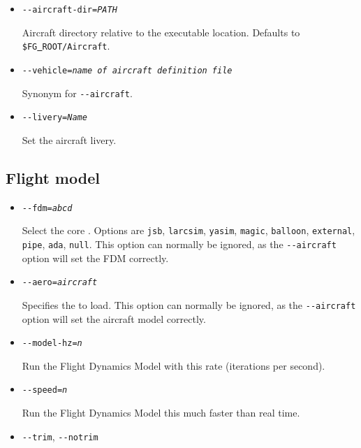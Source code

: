 {\begin{itemize}
\item{\texttt{-$ $-aircraft-dir={\it PATH}}}

Aircraft directory relative to the executable location. Defaults to \texttt{\$FG\underline{~}ROOT/Aircraft}.

\item{\texttt{-$ $-vehicle={\it name of aircraft definition file}}}

Synonym for \texttt{-$ $-aircraft}.

\item{\texttt{-$ $-livery={\it Name}}}

Set the aircraft livery.

\end{itemize}

\subsection{Flight model}\label{flight dynamics model}
\begin{itemize}
\item{\texttt{-$ $-fdm={\it abcd}}}

Select the core . Options are \texttt{jsb}, \texttt{larcsim}, \texttt{yasim},
\texttt{magic}, \texttt{balloon}, \texttt{external}, \texttt{pipe}, \texttt{ada}, \texttt{null}.
This option can normally be ignored, as the \texttt{-$ $-aircraft} option will set the FDM correctly.

\item{\texttt{-$ $-aero={\it aircraft}}}

Specifies the  to load. This option can normally be ignored, as
the \texttt{-$ $-aircraft} option will set the aircraft model correctly.

\item{\texttt{-$ $-model-hz={\it n}}}

Run the Flight Dynamics Model with this rate (iterations per second).

\item{\texttt{-$ $-speed={\it n}}}

Run the Flight Dynamics Model this much faster than real time.

\item{\texttt{-$ $-trim}, \texttt{-$ $-notrim}}


\end{itemize}}
